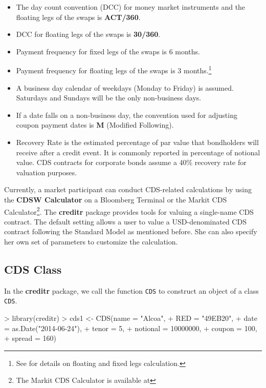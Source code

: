 \documentclass{jss}
\renewenvironment{Schunk}{\vspace{\topsep}}{\vspace{\topsep}}
\begin{document}
\begin{itemize}
\item The day count convention (DCC) for money market instruments and
  the floating legs of the swaps is \textbf{ACT/360}.
\item DCC for floating legs of the swaps is \textbf{30/360}.
\item Payment frequency for fixed legs of the swaps is 6 months.
\item Payment frequency for floating legs of the swaps is 3
  months.\footnote{See
    for details on floating and fixed legs calculation.}
\item A business day calendar of weekdays (Monday to Friday) is
  assumed. Saturdays and Sundays will be the only non-business days.
\item If a date falls on a non-business day, the convention used for
  adjusting coupon payment dates is \textbf{M} (Modified Following).
\item Recovery Rate is the estimated percentage of par value that
  bondholders will receive after a credit event. It is commonly
  reported in percentage of notional value. CDS contracts for corporate bonds
  assume a 40\% recovery rate for valuation purposes. 
\end{itemize}


Currently, a market participant can conduct CDS-related calculations by using the \textbf{CDSW Calculator} on a Bloomberg Terminal or the Markit CDS Calculator\footnote{The Markit CDS Calculator is available
  at}. The \textbf{creditr} package provides tools for valuing a single-name CDS contract. The default setting allows a user to value a USD-denominated CDS contract following the Standard Model as mentioned before. She can also specify her own set of parameters to customize the calculation. 

\subsection{CDS Class}


In the \textbf{creditr} package, we call the function \texttt{CDS} to construct an object of a class \texttt{CDS}. 


\begin{Schunk}
\begin{Sinput}
> library(creditr)
> cds1 <- CDS(name     = "Alcoa",
+             RED      = "49EB20",
+             date     = as.Date("2014-06-24"),
+             tenor    = 5,
+             notional = 10000000,
+             coupon   = 100,
+             spread   = 160)
\end{Sinput}
\end{Schunk}
\end{document}
